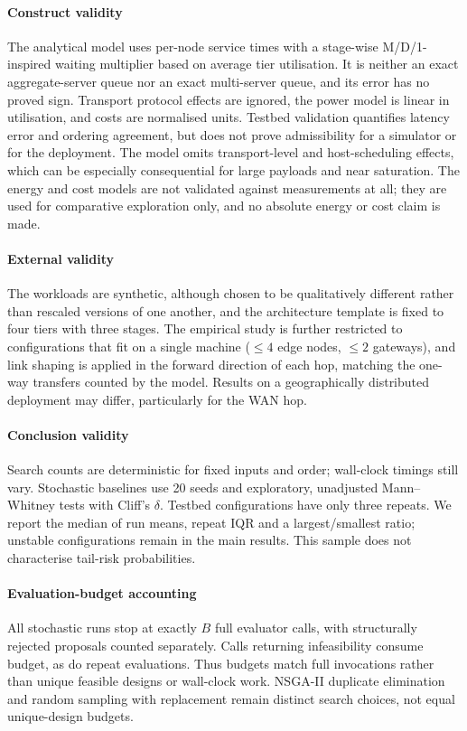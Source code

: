 \documentclass[preprint,11pt,3p]{elsarticle}
\theoremstyle{plain}
\theoremstyle{definition}
\begin{document}
\paragraph{Construct validity}
The analytical model uses per-node service times with a stage-wise M/D/1-inspired
waiting multiplier based on average tier utilisation. It is neither an exact
aggregate-server queue nor an exact multi-server queue, and its error has no
proved sign. Transport protocol effects are ignored, the power model is linear
in utilisation, and costs are normalised units. Testbed validation quantifies
latency error and ordering agreement, but does not prove admissibility for a
simulator or for the deployment.
The model omits transport-level and host-scheduling effects, which can be especially consequential for large payloads and near saturation.
The energy and cost models are not validated against measurements at all; they are used
for comparative exploration only, and no absolute energy or cost claim is made.

\paragraph{External validity}
The workloads are synthetic, although chosen to be qualitatively different rather than
rescaled versions of one another, and the architecture template is fixed to four tiers
with three stages. The empirical study is further restricted to configurations that fit on
a single machine ($\le4$ edge nodes, $\le2$ gateways), and link shaping is applied in the
forward direction of each hop, matching the one-way transfers counted by the model. Results
on a geographically distributed deployment may differ, particularly for the WAN hop.

\paragraph{Conclusion validity}
Search counts are deterministic for fixed inputs and order; wall-clock timings still
vary. Stochastic baselines use 20 seeds and exploratory, unadjusted Mann--Whitney tests
with Cliff's $\delta$. Testbed configurations have only three repeats. We report the
median of run means, repeat IQR and a largest/smallest ratio; unstable configurations
remain in the main results. This sample does not characterise tail-risk probabilities.

\paragraph{Evaluation-budget accounting}
All stochastic runs stop at exactly $B$ full evaluator calls, with structurally rejected
proposals counted separately. Calls returning infeasibility consume budget, as do repeat
evaluations. Thus budgets match full invocations rather than unique feasible designs or
wall-clock work. NSGA-II duplicate elimination and random sampling with replacement
remain distinct search choices, not equal unique-design budgets.
\end{document}
